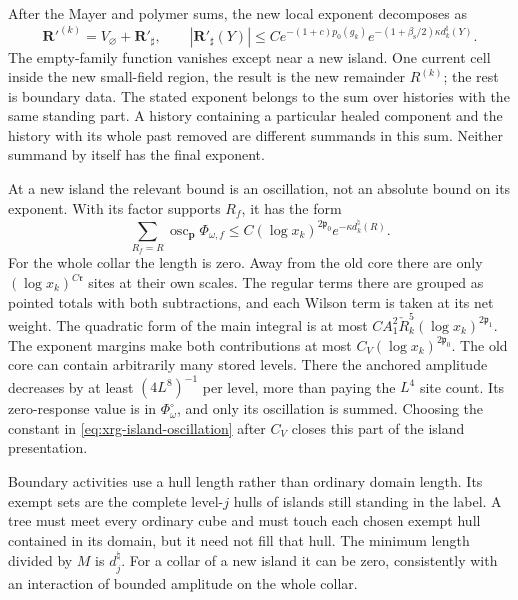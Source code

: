 \documentclass[11pt,letterpaper,reqno]{amsart}
\theoremstyle{definition}
\theoremstyle{remark}
\begin{document}
After the Mayer and polymer sums,
the new local exponent decomposes as
\begin{equation}\label{eq:local-exponentiation-bound}
 \mathbf R'^{(k)}=V_\varnothing+\mathbf R'_\sharp,
 \qquad
 |\mathbf R'_\sharp(Y)|
   \le Ce^{-(1+c)p_0(g_k)}
             e^{-(1+\beta_{\mathrm s}/2)\kappa d_k^\natural(Y)}.
\end{equation}
The empty-family function vanishes
except near a new island. One current
cell inside the new small-field region,
the result is the new remainder
$R^{(k)}$; the rest is boundary data.
The stated exponent belongs to the
sum over histories with the same
standing part. A history containing
a particular healed component and
the history with its whole past
removed are different summands in
this sum. Neither summand by itself
has the final exponent.

At a new island the relevant bound
is an oscillation, not an absolute
bound on its exponent. With its
factor supports $R_f$, it has the form
\begin{equation}\label{eq:xrg-island-oscillation}
 \sum_{R_f=R}\operatorname{osc}_{\mathbf p}
                   \Phi_{\omega,f}
       \le C(\log x_k)^{2\mathfrak p_0}
                            e^{-\kappa d_k^\natural(R)}.
\end{equation}
For the whole collar the length is
zero. Away from the old core there
are only $(\log x_k)^{C\mathfrak r}$
sites at their own scales. The
regular terms there are grouped as
pointed totals with both subtractions,
and each Wilson term is taken at its
net weight. The quadratic form of
the main integral is at most
$CA_1^2\check R_k^5
 (\log x_k)^{2\mathfrak p_1}$.
The exponent margins make both
contributions at most
$C_V(\log x_k)^{2\mathfrak p_0}$.
The old core can contain arbitrarily
many stored levels. There the
anchored amplitude decreases by
at least $(4L^8)^{-1}$ per level,
more than paying the $L^4$ site
count. Its zero-response value is
in $\Phi^\circ_\omega$, and only
its oscillation is summed.
Choosing the constant in
\eqref{eq:xrg-island-oscillation}
after $C_V$ closes this part of
the island presentation.

Boundary activities use a hull length rather than
ordinary domain length. Its exempt sets are the
complete level-$j$ hulls of islands still standing
in the label. A tree must meet every ordinary cube
and must touch each chosen exempt hull contained
in its domain, but it need not fill that hull.
The minimum length divided by $M$ is
$d_j^\natural$. For a collar of a new island it
can be zero, consistently with an interaction of
bounded amplitude on the whole collar.
\end{document}
